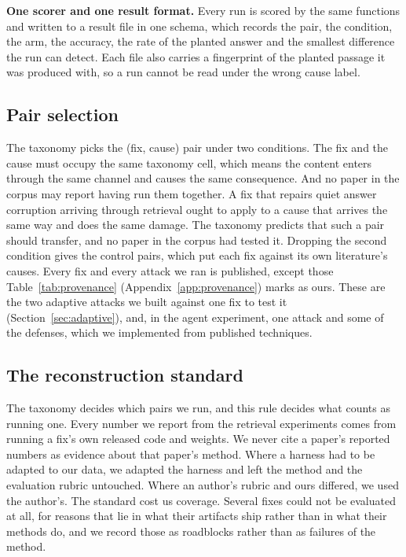 \textbf{One scorer and one result format.} Every run is scored by the same
functions and written to a result file in one schema, which records the pair,
the condition, the arm, the accuracy, the rate of the planted answer and the
smallest difference the run can detect. Each file also carries a fingerprint
of the planted passage it was produced with, so a run cannot be read under
the wrong cause label.

\subsection{Pair selection}

The taxonomy picks the (fix, cause) pair under two conditions. The fix and
the cause must occupy the same taxonomy cell, which means the content enters
through the same channel and causes the same consequence. And no paper in the
corpus may report having run them together. A fix that repairs quiet answer corruption arriving through retrieval
ought to apply to a cause that arrives the same way and does the same
damage. The taxonomy predicts that such a pair should transfer, and no paper
in the corpus had tested it. Dropping the second condition gives the control pairs, which put each fix against its
own literature's causes. Every fix and every attack we ran is published, except those Table~\ref{tab:provenance} (Appendix~\ref{app:provenance}) marks as ours. These are the two adaptive attacks we built against one fix to test it (Section~\ref{sec:adaptive}), and, in the agent experiment, one attack and some of the defenses, which we implemented from published techniques.

\subsection{The reconstruction standard}

The taxonomy decides which pairs we run, and this rule decides what counts as
running one. Every number we report from the retrieval experiments comes from running a fix's own released code and weights. We never cite a paper's reported numbers as evidence about that
paper's method. Where a harness had to be adapted to our data, we adapted the
harness and left the method and the evaluation rubric untouched. Where an
author's rubric and ours differed, we used the author's. The standard cost us coverage. Several fixes could not be evaluated at
all, for reasons that lie in what their artifacts ship rather than in what
their methods do, and we record those as roadblocks rather than as failures
of the method.

